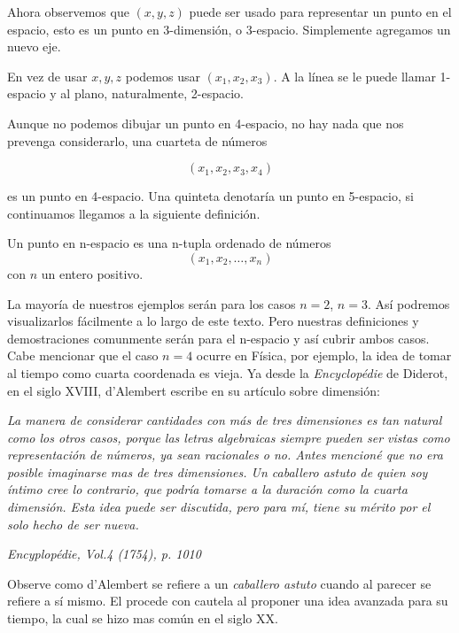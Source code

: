Ahora observemos que $(x,y,z)$ puede ser usado para representar un punto en el espacio, esto es un
punto en 3-dimensión, o 3-espacio. Simplemente agregamos un nuevo eje.

En vez de usar $x,y,z$ podemos usar $(x_{1},x_{2},x_{3})$. A la línea se le puede llamar 1-espacio y
al plano, naturalmente, 2-espacio.

Aunque no podemos dibujar un punto en 4-espacio, no hay nada que nos prevenga considerarlo, una cuarteta
de números

$$(x_{1},x_{2},x_{3},x_{4})$$

es un punto en 4-espacio. Una quinteta denotar\'ia un punto en 5-espacio, si continuamos llegamos a la siguiente
definición.

\begin{definition}
    Un punto en n-espacio es una n-tupla ordenado de números
    $$ (x_{1},x_{2}, \ldots ,x_{n}) $$
    con $n$ un entero positivo.
\end{definition}

La mayor\'ia de nuestros ejemplos serán para los casos $n=2$, $n=3$. Así podremos visualizarlos f\'acilmente a
lo largo de este texto. Pero nuestras definiciones y demostraciones comunmente serán para el n-espacio y así
cubrir ambos casos. Cabe mencionar que el caso $n=4$ ocurre en Física, por ejemplo, la idea de tomar al tiempo
como cuarta coordenada es vieja. Ya desde la \emph{Encyclopédie} de Diderot, en el siglo XVIII, d'Alembert escribe 
en su artículo sobre dimensión:

\vspace{0.5cm}

\emph{La manera de considerar cantidades con m\'as de tres dimensiones es tan natural como los otros casos,
porque las letras algebraicas siempre pueden ser vistas como representación de números, ya sean racionales
o no. Antes mencion\'e que no era posible imaginarse mas de tres dimensiones. Un caballero astuto de quien soy
íntimo cree lo contrario, que podr\'ia tomarse a la duración como la cuarta dimensión. Esta idea puede ser
discutida, pero para mí, tiene su mérito por el solo hecho de ser nueva.}

\begin{flushright}
    \emph{Encyplopédie, Vol.4 (1754), p. 1010}
\end{flushright}

Observe como d'Alembert se refiere a un \emph{caballero astuto} cuando al parecer se refiere a s\'i mismo. El procede
con cautela al proponer una idea avanzada para su tiempo, la cual se hizo mas común en el siglo XX.

